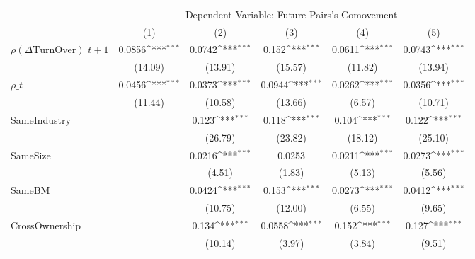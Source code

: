 {
\def\sym#1{\ifmmode^{#1}\else\(^{#1}\)\fi}
\begin{tabular}{l*{5}{c}}
\hline\hline
                    &\multicolumn{5}{c}{Dependent Variable:  Future Pairs's Comovement}                                           \\\cmidrule(lr){2-6}
                    &\multicolumn{1}{c}{(1)}         &\multicolumn{1}{c}{(2)}         &\multicolumn{1}{c}{(3)}         &\multicolumn{1}{c}{(4)}         &\multicolumn{1}{c}{(5)}         \\
\hline
 $ {\rho(\Delta \text{TurnOver})\_{t+1}} $ &      0.0856\sym{***}&      0.0742\sym{***}&       0.152\sym{***}&      0.0611\sym{***}&      0.0743\sym{***}\\
                    &     (14.09)         &     (13.91)         &     (15.57)         &     (11.82)         &     (13.94)         \\
[1em]
 $ {\rho\_t} $       &      0.0456\sym{***}&      0.0373\sym{***}&      0.0944\sym{***}&      0.0262\sym{***}&      0.0356\sym{***}\\
                    &     (11.44)         &     (10.58)         &     (13.66)         &      (6.57)         &     (10.71)         \\
[1em]
SameIndustry        &                     &       0.123\sym{***}&       0.118\sym{***}&       0.104\sym{***}&       0.122\sym{***}\\
                    &                     &     (26.79)         &     (23.82)         &     (18.12)         &     (25.10)         \\
[1em]
SameSize            &                     &      0.0216\sym{***}&      0.0253         &      0.0211\sym{***}&      0.0273\sym{***}\\
                    &                     &      (4.51)         &      (1.83)         &      (5.13)         &      (5.56)         \\
[1em]
SameBM              &                     &      0.0424\sym{***}&       0.153\sym{***}&      0.0273\sym{***}&      0.0412\sym{***}\\
                    &                     &     (10.75)         &     (12.00)         &      (6.55)         &      (9.65)         \\
[1em]
CrossOwnership      &                     &       0.134\sym{***}&      0.0558\sym{***}&       0.152\sym{***}&       0.127\sym{***}\\
                    &                     &     (10.14)         &      (3.97)         &      (3.84)         &      (9.51)         \\

\end{tabular}}
